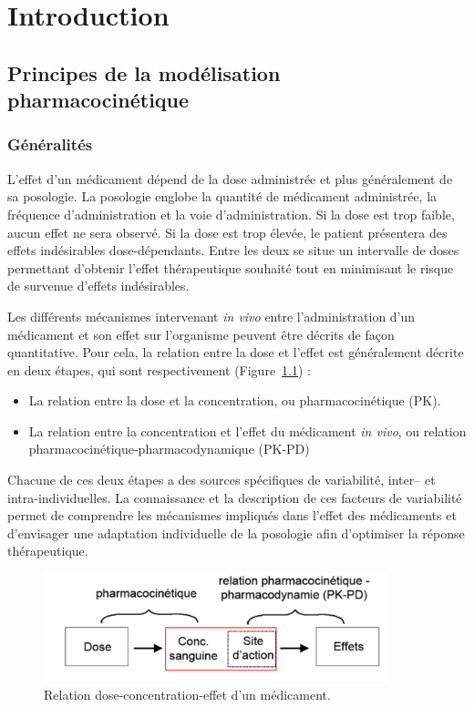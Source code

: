 \chapter{Introduction}
\section{Principes de la modélisation pharmacocinétique}
\subsection{Généralités}
L'effet d'un médicament dépend de la dose administrée et plus généralement de sa posologie. La posologie englobe la quantité de médicament administrée, la fréquence d'administration et la voie d'administration. Si la dose est trop faible, aucun effet ne sera observé. Si la dose est trop élevée, le patient présentera des effets indésirables dose-dépendants. Entre les deux se situe un intervalle de doses permettant d'obtenir l'effet thérapeutique souhaité tout en minimisant le risque de survenue d'effets indésirables.

Les différents mécanismes intervenant \textit{in vivo} entre l'administration d'un médicament et son effet sur l'organisme peuvent être décrits de façon quantitative. Pour cela, la relation entre la dose et l'effet est généralement décrite en deux étapes, qui sont respectivement (Figure~\ref{fig:1}) :
\begin{itemize}
\item La relation entre la dose et la concentration, ou pharmacocinétique (PK).
\item La relation entre la concentration et l'effet du médicament \textit{in vivo}, ou relation pharmacocinétique-pharmacodynamique (PK-PD)
\end{itemize}

Chacune de ces deux étapes a des sources spécifiques de variabilité, inter-- et intra-individuelles. La connaissance et la description de ces facteurs de variabilité permet de comprendre les mécanismes impliqués dans l'effet des médicaments et d'envisager une adaptation individuelle de la posologie afin d'optimiser la réponse thérapeutique.

\begin{figure}[h!]
	\centering
		\includegraphics[width=10cm]{figures/raster/FIG_1}
	\caption{Relation dose-concentration-effet d'un médicament.}
	\label{fig:1}
\end{figure}

